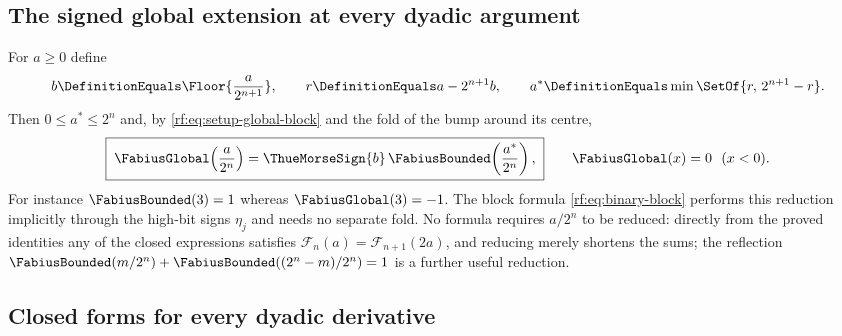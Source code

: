 \documentclass[11pt,oneside]{article}
\theoremstyle{plain}
\theoremstyle{definition}
\theoremstyle{remark}
\newcommand{\Fb}{\FabiusBounded}            %
\newcommand{\Fg}{\FabiusGlobal}             %
\newcommand{\tm}[1]{\ThueMorseSign{#1}}     %
\begin{document}
\subsection{The signed global extension at every dyadic argument}
\label{rf:sec:rvachev-global}

For $a\ge0$ define
\begin{equation}
 b\DefinitionEquals\Floor{\frac{a}{2^{n+1}}},\qquad
 r\DefinitionEquals a-2^{n+1}b,\qquad
 a^{\ast}\DefinitionEquals\min\SetOf{r,\,2^{n+1}-r}.
 \label{rf:eq:rvachev-global-data}
\end{equation}
Then $0\le a^{\ast}\le2^{n}$ and, by \cref{rf:eq:setup-global-block} and the
fold of the bump around its centre,
\begin{equation}
 \boxed{\;
 \Fg\!\left(\frac{a}{2^{n}}\right)=\tm{b}\,\Fb\!\left(\frac{a^{\ast}}{2^{n}}\right),\;}
 \qquad\Fg(x)=0\ \ (x<0).
 \label{rf:eq:rvachev-global-fold}
\end{equation}
For instance $\Fb(3)=1$ whereas $\Fg(3)=-1$.  The block formula
\cref{rf:eq:binary-block} performs this reduction implicitly through the
high-bit signs $\eta_{j}$ and needs no separate fold.  No formula requires
$a/2^{n}$ to be reduced: directly from the proved identities any of the
closed expressions satisfies $\mathcal F_{n}(a)=\mathcal F_{n+1}(2a)$, and
reducing merely shortens the sums; the reflection
$\Fb(m/2^{n})+\Fb((2^{n}-m)/2^{n})=1$ is a further useful reduction.

\subsection{Closed forms for every dyadic derivative}
\label{rf:sec:rvachev-derivatives}
\end{document}
